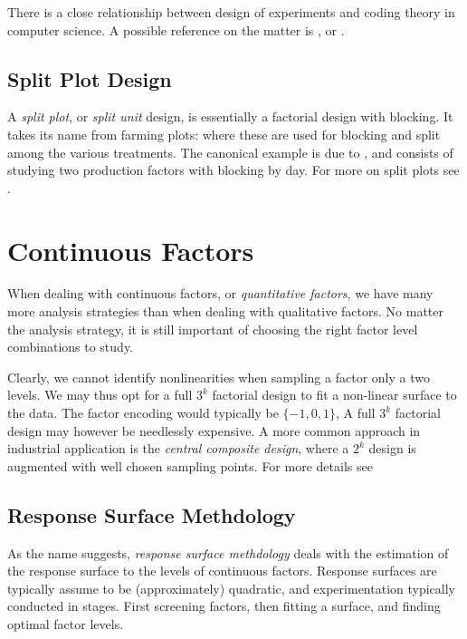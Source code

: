 \begin{extra}
There is a close relationship between design of experiments and coding theory in computer science. 
A possible reference on the matter is \cite{hill_first_1986}, or \cite{hedayat_orthogonal_1999}.
\end{extra}



\subsection{Split Plot Design}
\label{sec:split_plot}
A \emph{split plot}, or \emph{split unit} design, is essentially a factorial design with blocking. 
It takes its name from farming plots: where these are used for blocking and split among the various treatments. 
The canonical example is due to \cite[Sec.12.4]{montgomery_design_2012}, and consists of studying two production factors with blocking by day. 
For more on split plots see \cite[Sec.6.4]{cox_theory_2000}.



\section{Continuous Factors}
When dealing with continuous factors, or \emph{quantitative factors}, we have many more analysis strategies than when dealing with qualitative factors.
No matter the analysis strategy, it is still important of choosing the right factor level combinations to study.

Clearly, we cannot identify nonlinearities when sampling a factor only a two levels.
We may thus opt for a full $3^k$ factorial design to fit a non-linear surface to the data.
The factor encoding would typically be $\{-1,0,1\}$,
A full $3^k$ factorial design may however be needlessly expensive. 
A more common approach in industrial application is the \emph{central composite design}, where a $2^k$ design is augmented with well chosen sampling points. 
For more details see \cite[Sec.6.6]{cox_theory_2000}


\subsection{Response Surface Methdology}
\label{sec:response_surface}
As the name suggests, \emph{response surface methdology} deals with the estimation of the response surface to the levels of continuous factors.
Response surfaces are typically assume to be (approximately) quadratic, and experimentation typically conducted in stages. First screening factors, then fitting a surface, and finding optimal factor levels.



